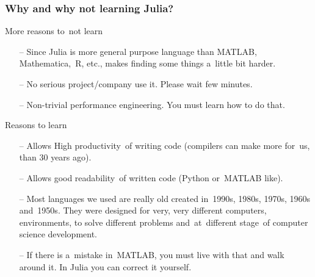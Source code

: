 \documentclass{beamer}  %
\begin{document}
\begin{frame}
  \frametitle{Why and why not learning Julia?}

  \begin{block}{More reasons to~not learn}
    \begin{itemize}
    \item[--] Since Julia is more general purpose language than
      MATLAB, Mathematica,~R, etc., makes finding some things a~little
      bit harder.
    \item[--] No serious project/company use it. Please wait few
      minutes.
    \item[--] Non-trivial performance engineering. You must learn how
      to do that.
    \end{itemize}
  \end{block}

  \begin{block}{Reasons to learn}
    \begin{itemize}
    \item[--] Allows High productivity~of writing code (compilers can
      make more for~us, than 30 years ago).
    \item[--] Allows good readability~of written code (Python
      or~MATLAB like).
    \item[--] Most languages we used are really old created in~1990s,
      1980s, 1970s, 1960s and~1950s. They were designed for very, very
      different computers, environments, to solve different problems
      and~at~different stage~of computer science development.
    \item[--] If there is a~mistake in~MATLAB, you must live with that
      and walk around it. In Julia you can correct it yourself.
    \end{itemize}
  \end{block}
  
\end{frame}





\end{document}
